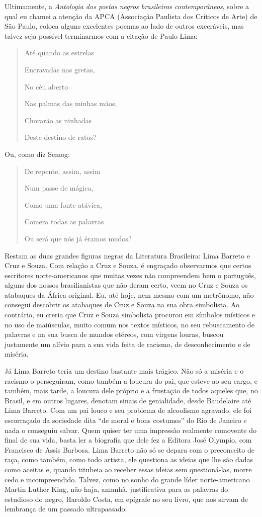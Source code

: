 \documentclass[
  letterpaper,
  DIV=11,
  numbers=noendperiod]{scrreprt}
\begin{document}
Ultimamente, a \emph{Antologia dos poetas negros brasileiros
contemporâneos}, sobre a qual eu chamei a atenção da APCA (Associação
Paulista dos Críticos de Arte) de São Paulo, coloca alguns excelentes
poemas ao lado de outros execráveis, mas talvez seja possível
terminarmos com a citação de Paulo Lima:

\begin{quote}
Até quando as estrelas~

Encravadas nas gretas,~

No céu aberto~

Nas palmas das minhas mãos,~

Chorarão as ninhadas~

Deste destino de ratos?
\end{quote}

Ou, como diz Semog:

\begin{quote}
De repente, assim, assim~

Num passe de mágica,~

Como uma fonte atávica,~

Comera todas as palavras~

Ou será que nós já éramos mudos?
\end{quote}

Restam as duas grandes figuras negras da Literatura Brasileira: Lima
Barreto e Cruz e Souza. Com relação a Cruz e Souza, é engraçado
observarmos que certos escritores norte-americanos que muitas vezes não
compreendem bem o português, alguns dos nossos brasilianistas que não
deram certo, veem no Cruz e Souza os atabaques da África original. Eu,
até hoje, nem mesmo com um metrônomo, não consegui descobrir os
atabaques de Cruz e Souza na sua obra simbolista. Ao contrário, eu
creria que Cruz e Souza simbolista procurou em símbolos místicos e no
uso de maiúsculas, muito comum nos textos místicos, no seu rebuscamento
de palavras e na sua busca de mundos etéreos, com virgens louras, buscou
justamente um alívio para a sua vida feita de racismo, de
desconhecimento e de miséria.

Já Lima Barreto teria um destino bastante mais trágico. Não só a miséria
e o racismo o perseguiram, como também a loucura do pai, que esteve ao
seu cargo, e também, mais tarde, a loucura dele próprio e a frustação de
todos aqueles que, no Brasil, e em outros lugares, denotam sinais de
genialidade, desde Baudelaire até Lima Barreto. Com um pai louco e seu
problema de alcoolismo agravado, ele foi escorraçado da sociedade dita
``de moral e bons costumes'' do Rio de Janeiro e nada o conseguiu
salvar. Quem quiser ter uma impressão realmente comovente do final de
sua vida, basta ler a biografia que dele fez a Editora José Olympio, com
Francisco de Assis Barbosa. Lima Barreto não só se depara com o
preconceito de raça, como também, como todo artista, ele questiona as
ideias que lhe são dadas como aceitas e, quando titubeia ao receber
essas ideias sem questioná-las, morre cedo e incompreendido. Talvez,
como no sonho do grande líder norte-americano Martin Luther King, não
haja, amanhã, justificativa para as palavras do estudioso do negro,
Haroldo Costa, em epígrafe no seu livro, que nos sirvam de lembrança de
um passado ultrapassado:
\end{document}
